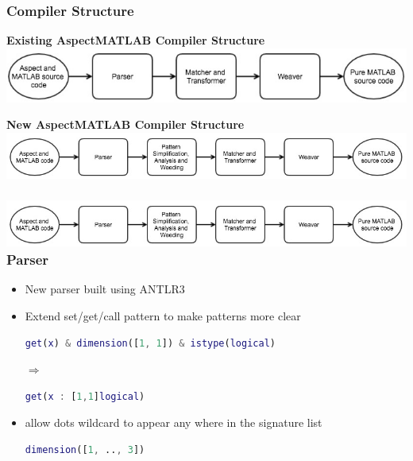 \documentclass[10pt]{beamer}
\begin{document}
\begin{frame}
\frametitle{Compiler Structure}
\textbf{Existing AspectMATLAB Compiler Structure}
\includegraphics[scale=0.4]{old_structure}

\textbf{New AspectMATLAB Compiler Structure}
\includegraphics[scale=0.4]{new_structure}
\end{frame}

\begin{frame}[fragile]
\frametitle{\includegraphics[scale=0.4]{new_structure}\\Parser}
\begin{itemize}
\item New parser built using ANTLR3
\item Extend set/get/call pattern to make patterns more clear
\begin{lstlisting}[basicstyle=\small, language=MATLAB]
get(x) & dimension([1, 1]) & istype(logical)    
\end{lstlisting}    
$\Rightarrow$
\begin{lstlisting}[basicstyle=\small, language=MATLAB]
get(x : [1,1]logical)    
\end{lstlisting}
\item allow dots wildcard to appear any where in the signature list
\begin{lstlisting}[basicstyle=\small, language=MATLAB]
dimension([1, .., 3])
\end{lstlisting}
\end{itemize}
\end{frame}
\end{document}

